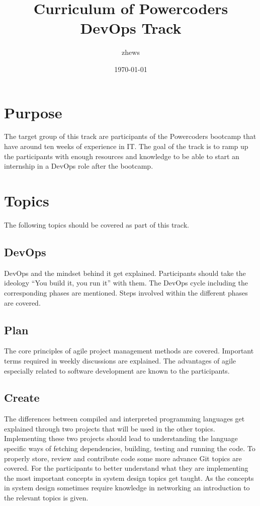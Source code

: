 \documentclass{article}
\title{Curriculum of Powercoders DevOps Track}
\author{zhews}
\date{\today}
\begin{document}
\maketitle
\thispagestyle{empty}

\newpage

\tableofcontents

\newpage

\section{Purpose}

The target group of this track are participants of the Powercoders bootcamp that
have around ten weeks of experience in IT. The goal of the track is to ramp up
the participants with enough resources and knowledge to be able to start an
internship in a DevOps role after the bootcamp.

\newpage

\section{Topics}

The following topics should be covered as part of this track.

\subsection{DevOps}

DevOps and the mindset behind it get explained. Participants should take the
ideology ``You build it, you run it'' with them. The DevOps cycle including the
corresponding phases are mentioned. Steps involved within the different phases
are covered.

\subsection{Plan}

The core principles of agile project management methods are covered. Important
terms required in weekly discussions are explained. The advantages of agile
especially related to software development are known to the participants.

\subsection{Create}

The differences between compiled and interpreted programming languages get
explained through two projects that will be used in the other topics.
Implementing these two projects should lead to understanding the language
specific ways of fetching dependencies, building, testing and running the code.
To properly store, review and contribute code some more advance Git topics are
covered. For the participants to better understand what they are implementing
the most important concepts in system design topics get taught. As the concepts
in system design sometimes require knowledge in networking an introduction to
the relevant topics is given.
\end{document}
